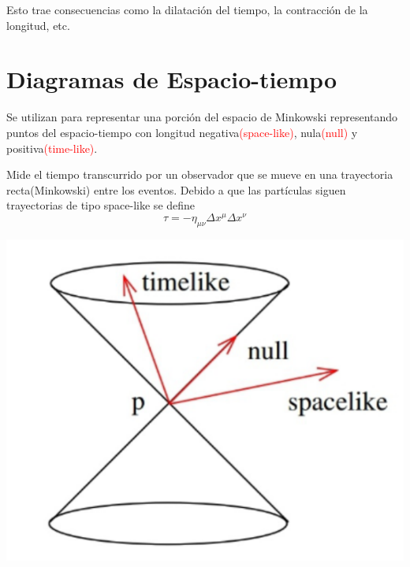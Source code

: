 \documentclass[../main]{subfiles}
\begin{document}
Esto trae consecuencias como la dilatación del tiempo, la contracción de la longitud, etc.

\section{Diagramas de Espacio-tiempo}
Se utilizan para representar una porción del espacio de Minkowski representando puntos del espacio-tiempo con longitud negativa\textcolor{red}{(space-like)}, nula\textcolor{red}{(null)} y positiva\textcolor{red}{(time-like)}.

 Mide el tiempo transcurrido por un observador que se mueve en una trayectoria recta(Minkowski) entre los eventos. Debido a que las partículas siguen trayectorias de tipo space-like se define 
\begin{equation}
    \tau=-\eta_{\mu\nu} \Delta x^{\mu}\Delta x^{\nu}
\end{equation}
\begin{center}
    \includegraphics[scale=0.4]{img/imgRG2.4.PNG}
\end{center}
\end{document}
